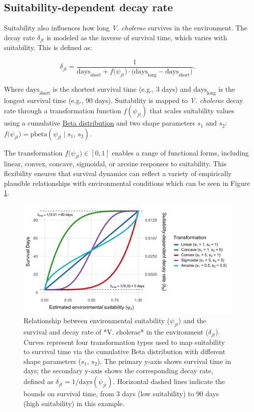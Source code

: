 \documentclass[
]{book}
\begin{document}
\subsection{Suitability-dependent decay rate}\label{suitability-dependent-decay-rate}

Suitability also influences how long \emph{V. cholerae} survives in the environment. The decay rate \(\delta_{jt}\) is modeled as the inverse of survival time, which varies with suitability. This is defined as:

\[
\delta_{jt} = \frac{1}{\text{days}_{\text{short}} + f\big(\psi_{jt}\big) \cdot \big(\text{days}_{\text{long}} - \text{days}_{\text{short}}\big)}.
\label{eq:delta}
\]

Where \(\text{days}_{\text{short}}\) is the shortest survival time (e.g., 3 days) and \(\text{days}_{\text{long}}\) is the longest survival time (e.g., 90 days). Suitability is mapped to \emph{V. cholerae} decay rate through a transformation function \(f(\psi_{jt})\) that scales suitability values using a cumulative \href{https://en.wikipedia.org/wiki/Beta_distribution}{Beta distribution} and two shape parameters \(s_1\) and \(s_2\): \(f\big(\psi_{jt}\big) = \text{pbeta}(\psi_{jt} \mid s_1, \, s_2)\).

The transformation \(f\big(\psi_{jt}\big) \in [0, 1]\) enables a range of functional forms, including linear, convex, concave, sigmoidal, or arcsine responses to suitability. This flexibility ensures that survival dynamics can reflect a variety of empirically plausible relationships with environmental conditions which can be seen in Figure \ref{fig:vibrio-decay-rate}.

\begin{figure}

{\centering \includegraphics[width=1\linewidth]{figures/vibrio_decay_rate} 

}

\caption{Relationship between environmental suitability ($\psi_{jt}$) and the survival and decay rate of *V. cholerae* in the environment ($\delta_{jt}$). Curves represent four transformation types used to map suitability to survival time via the cumulative Beta distribution with different shape parameters ($s_1$, $s_2$). The primary y-axis shows survival time in days; the secondary y-axis shows the corresponding decay rate, defined as $\delta_{jt} = 1/\text{days}(\psi_{jt})$. Horizontal dashed lines indicate the bounds on survival time, from 3 days (low suitability) to 90 days (high suitability) in this example.}\label{fig:vibrio-decay-rate}
\end{figure}
\end{document}
